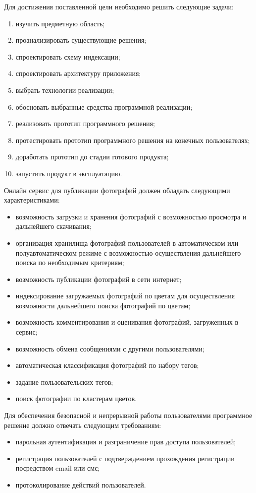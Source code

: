 Для достижения поставленной цели необходимо решить следующие задачи:
\begin{enumerate}
    \item изучить предметную область;
    \item проанализировать существующие решения;
    \item спроектировать схему индексации;
    \item спроектировать архитектуру приложения;
    \item выбрать технологии реализации;
    \item обосновать выбранные средства программной реализации;
    \item реализовать прототип программного решения;
    \item протестировать прототип программного решения на конечных пользователях;
    \item доработать прототип до стадии готового продукта;
    \item запустить продукт в эксплуатацию.
\end{enumerate}

Онлайн сервис для публикации фотографий должен обладать следующими характеристиками:
\begin{itemize}
    \item возможность загрузки и хранения фотографий с возможностью просмотра и дальнейшего скачивания;
    \item организация хранилища фотографий пользователей в автоматическом или полуавтоматическом режиме с возможностью осуществления дальнейшего поиска по необходимым критериям;
    \item возможность публикации фотографий в сети интернет;
    \item индексирование загружаемых фотографий по цветам для осуществления возможности дальнейшего поиска фотографий по цветам;
    \item возможность комментирования и оценивания фотографий, загруженных в сервис;
    \item возможность обмена сообщениями с другими пользователями;
    \item автоматическая классификация фотографий по набору тегов;
    \item задание пользовательских тегов;
    \item поиск фотографии по кластерам цветов.
\end{itemize}

Для обеспечения безопасной и непрерывной работы пользователями программное решение должно отвечать следующим требованиям:
\begin{itemize}
    \item парольная аутентификация и разграничение прав доступа пользователей;
    \item регистрация пользователей с подтверждением прохождения регистрации посредством email или смс;
    \item протоколирование действий пользователей.
\end{itemize}

\clearpage